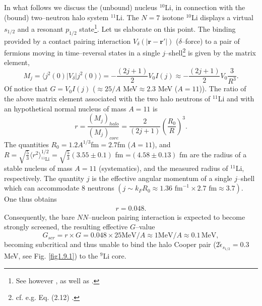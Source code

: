  In what follows we discuss the (unbound) nucleus $^{10}$Li, in connection with the (bound) two--neutron halo system $^{11}$Li. The $N=7$ isotone $^{10}$Li displays a virtual $s_{1/2}$ and a resonant $p_{1/2}$ state\footnote{See however \cite{Cavallaro:17}, as well as \cite{Barranco:19}\cite{Moro:19}.}. Let us elaborate on this point. 
The binding provided by a contact pairing interaction $V_\delta (|\mathbf{r}-\mathbf{r}'|)$ ($\delta$--force) to a pair of fermions moving in time--reversal states in a single $j$--shell\footnote{cf. e.g. Eq. (2.12) \cite{Brink:05}.} is given by the matrix element,
\begin{equation}
M_j=\langle j^2(0)|V_\delta|j^2(0)\rangle=-\frac{(2j+1)}{2} V_0 I(j)\approx -\frac{(2j+1)}{2}V_0\frac{3}{R^3}.
\end{equation} 
Of notice that $G=V_0I(j)$ ($\approx 25/A$ MeV$\approx 2.3$ MeV ($A=11$)). 
The ratio of the above matrix element associated with the two halo neutrons of $^{11}$Li and with an hypothetical normal nucleus of mass $A=11$ is
\begin{equation}
r=\frac{(M_j)_{halo}}{(M_j)_{core}}=\frac{2}{(2j+1)}\left(\frac{R_0}{R}\right)^3.
\end{equation}
The quantities $R_0=1.2 A^{1/3}$fm$=2.7$fm ($A=11$), and $R=\sqrt{\frac{5}{3}}\langle r^2\rangle^{1/2}_{^{11}\text{Li}}=\sqrt{\frac{5}{3}}(3.55\pm0.1)$ fm =$(4.58\pm 0.13)$ fm are the radius of a stable nucleus of mass $A=11$ (systematics), and  the measured radius of $^{11}$Li, respectively. The quantity $j$ is the effective angular momentum of a single $j$--shell which can accommodate 8 neutrons $(j\sim k_F R_0\approx 1.36 \text{ fm}^{-1}\times2.7\text{ fm}\approx3.7)$. One thus obtains
\begin{align}\label{eq2.6.3}
r=0.048.
\end{align}
 Consequently, the bare $NN$--nucleon pairing interaction is expected to become strongly screened, the resulting effective $G$--value 
\begin{equation}\label{eq1C2AppF}
G_{scr}=r\times G=0.048\times 25 \text{MeV}/A\approx 1 \text{MeV}/A\approx 0.1\,\text{MeV},
\end{equation}
becoming subcritical and thus unable to bind the halo Cooper pair ($2\tilde \epsilon_{s_{1/2}}=0.3$ MeV, see Fig. \ref{fig1.9.1}) to the $^9$Li core.


